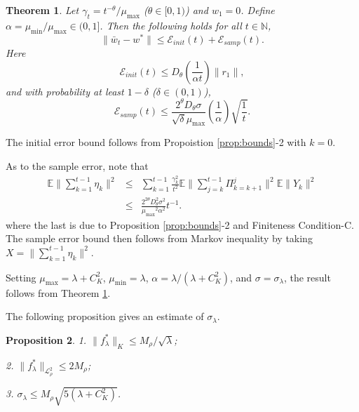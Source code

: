 \documentclass[twoside,twocolumn,journal]{IEEEtran}
\newtheorem{thm}{Theorem}[section]
\newtheorem{prop}[thm]{Proposition}
\newenvironment{pf}[1][Proof]{\medskip\noindent\hspace{1em}{\itshape #1: }}{\hspace*{\fill}~\QED\par\endtrivlist\medskip}
\def\N{{\mathbb N}}
\def\E{{\mathbb E}}        %
\def\L{{\mathscr L}}
\def\Err{{\mathscr E}}
\def\amax{{\mu_{\max}}}
\def\amin{{\mu_{\min}} }
\begin{document}
\medskip

\begin{thm} \label{thm:B1}
Let $\gamma_t = t^{-\theta}/\amax$ ($\theta\in [0,1)$) and $w_1=0$. Define $\alpha=\amin/\amax \in (0,1]$.
Then the following holds for all $t\in \N$,
\[ \| \bar{w}_t -w^\ast \| \leq \Err_{init}(t) + \Err_{samp}(t). \]
Here
\[ \Err_{init}(t)\leq  D_\theta\left(\frac{1}{\alpha t} \right)\|r_1\| , \]
and with probability at least $1-\delta$ ($\delta\in (0,1)$),
\[ \Err_{samp}(t) \leq  \frac{2^{\theta} D_\theta \sigma}{\sqrt{\delta} \amax} \left(\frac{1}{\alpha}\right) \sqrt{\frac{1}{t}}. \]
\end{thm}

\begin{pf}
The initial error bound follows from Propoistion \ref{prop:bounds}-2 with $k=0$.

As to the sample error, note that
\begin{eqnarray*}
\E \|\sum_{k=1}^{t-1} \eta_k\|^2 & \leq & \sum_{k=1}^{t-1} \frac{\gamma^2_k}{t^2}  \E\|\sum_{j=k}^{t-1}\Pi_{k=k+1}^j\|^2 \E \|Y_k\|^2 \\
& \leq & \frac{2^{2\theta} D_\theta^2 \sigma^2}{\amax^2\alpha^2}t^{-1}.
\end{eqnarray*}
where the last is due to Proposition \ref{prop:bounds}-2 and Finiteness Condition-C. The sample error bound then follows from Markov inequality
by taking $X=\|\sum_{k=1}^{t-1} \eta_k\|^2$.
\end{pf}

\begin{pf}[Proof of Theorem B*]
Setting $\amax=\lambda+C^2_K$, $\amin=\lambda$, $\alpha=\lambda/(\lambda+C^2_K)$, and $\sigma=\sigma_\lambda$, the result follows from Theorem \ref{thm:B1}.
\end{pf}

The following proposition gives an estimate of $\sigma_\lambda$.

\medskip

\begin{prop} \label{prop:varbnd}
1. $ \|f^\ast_\lambda\|_K \leq M_\rho /\sqrt{\lambda}$;

2. $\|f^\ast_\lambda\|_{\L^2_\rho} \leq 2 M_\rho$; 

3. $\sigma_\lambda \leq M_\rho\sqrt{5(\lambda+C^2_K)}$.
\end{prop}
\end{document}
